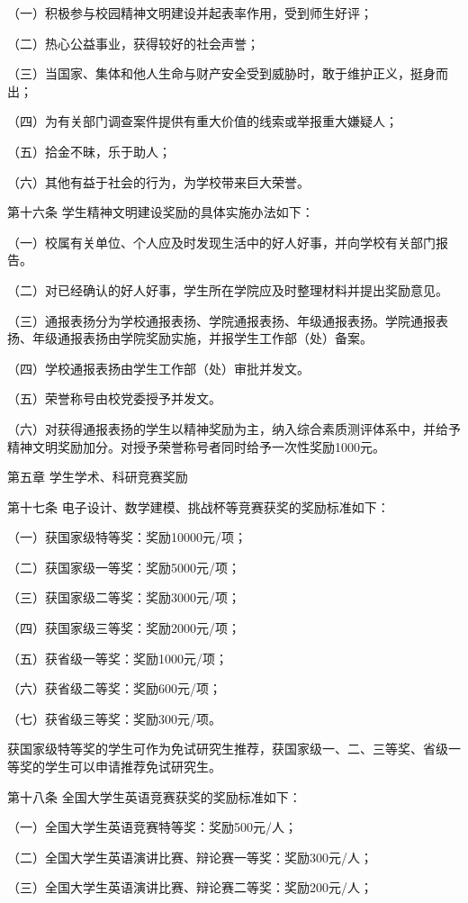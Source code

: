 \documentclass[UTF8,12pt,a4paper]{report}
\begin{document}
（一）积极参与校园精神文明建设并起表率作用，受到师生好评；

（二）热心公益事业，获得较好的社会声誉；

（三）当国家、集体和他人生命与财产安全受到威胁时，敢于维护正义，挺身而出；

（四）为有关部门调查案件提供有重大价值的线索或举报重大嫌疑人；

（五）拾金不昧，乐于助人；

（六）其他有益于社会的行为，为学校带来巨大荣誉。

第十六条  学生精神文明建设奖励的具体实施办法如下：

（一）校属有关单位、个人应及时发现生活中的好人好事，并向学校有关部门报告。

（二）对已经确认的好人好事，学生所在学院应及时整理材料并提出奖励意见。

（三）通报表扬分为学校通报表扬、学院通报表扬、年级通报表扬。学院通报表扬、年级通报表扬由学院奖励实施，并报学生工作部（处）备案。

（四）学校通报表扬由学生工作部（处）审批并发文。

（五）荣誉称号由校党委授予并发文。

（六）对获得通报表扬的学生以精神奖励为主，纳入综合素质测评体系中，并给予精神文明奖励加分。对授予荣誉称号者同时给予一次性奖励1000元。



第五章  学生学术、科研竞赛奖励

第十七条  电子设计、数学建模、挑战杯等竞赛获奖的奖励标准如下：

（一）获国家级特等奖：奖励10000元/项；

（二）获国家级一等奖：奖励5000元/项；

（三）获国家级二等奖：奖励3000元/项；

（四）获国家级三等奖：奖励2000元/项；

（五）获省级一等奖：奖励1000元/项；

（六）获省级二等奖：奖励600元/项；

（七）获省级三等奖：奖励300元/项。

获国家级特等奖的学生可作为免试研究生推荐，获国家级一、二、三等奖、省级一等奖的学生可以申请推荐免试研究生。

第十八条  全国大学生英语竞赛获奖的奖励标准如下：

（一）全国大学生英语竞赛特等奖：奖励500元/人；

（二）全国大学生英语演讲比赛、辩论赛一等奖：奖励300元/人；

（三）全国大学生英语演讲比赛、辩论赛二等奖：奖励200元/人；
\end{document}

